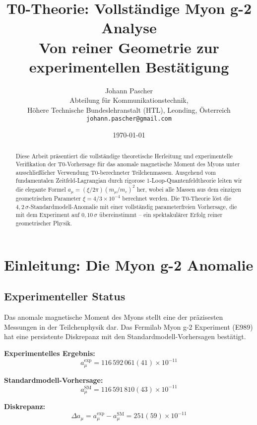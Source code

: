 \documentclass[12pt,a4paper]{article}
\title{T0-Theorie: Vollst\"andige Myon g-2 Analyse\\
	\large Von reiner Geometrie zur experimentellen Best\"atigung}
\author{Johann Pascher\\
	Abteilung f\"ur Kommunikationstechnik,\\
	H\"ohere Technische Bundeslehranstalt (HTL), Leonding, \"Osterreich\\
	\texttt{johann.pascher@gmail.com}}
\date{\today}
\numberwithin{equation}{section}
\begin{document}
	
	\maketitle
	
	\begin{abstract}
		Diese Arbeit pr\"asentiert die vollst\"andige theoretische Herleitung und experimentelle Verifikation der T0-Vorhersage f\"ur das anomale magnetische Moment des Myons unter ausschlie\ss{}licher Verwendung T0-berechneter Teilchenmassen. Ausgehend vom fundamentalen Zeitfeld-Lagrangian durch rigorose 1-Loop-Quantenfeldtheorie leiten wir die elegante Formel $a_\mu = (\xi/2\pi)(m_\mu/m_e)^2$ her, wobei alle Massen aus dem einzigen geometrischen Parameter $\xi = 4/3 \times 10^{-4}$ berechnet werden. Die T0-Theorie l\"ost die $4{,}2\,\sigma$-Standardmodell-Anomalie mit einer vollst\"andig parameterfreien Vorhersage, die mit dem Experiment auf $0{,}10\,\sigma$ \"ubereinstimmt -- ein spektakul\"arer Erfolg reiner geometrischer Physik.
	\end{abstract}
	
	\tableofcontents
	\newpage
	
	\section{Einleitung: Die Myon g-2 Anomalie}
	
	\subsection{Experimenteller Status}
	
	Das anomale magnetische Moment des Myons stellt eine der pr\"azisesten Messungen in der Teilchenphysik dar. Das Fermilab Myon g-2 Experiment (E989) hat eine persistente Diskrepanz mit den Standardmodell-Vorhersagen best\"atigt.
	
	\textbf{Experimentelles Ergebnis:}
	\begin{equation}
		a_\mu^{\text{exp}} = 116\,592\,061(41) \times 10^{-11}
	\end{equation}
	
	\textbf{Standardmodell-Vorhersage:}
	\begin{equation}
		a_\mu^{\text{SM}} = 116\,591\,810(43) \times 10^{-11}
	\end{equation}
	
	\textbf{Diskrepanz:}
	\begin{equation}
		\Delta a_\mu = a_\mu^{\text{exp}} - a_\mu^{\text{SM}} = 251(59) \times 10^{-11}
	\end{equation}
	
\end{document}
